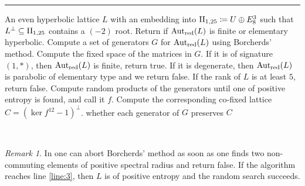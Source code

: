 \documentclass[11pt,letterpaper]{amsart}
\DeclareMathOperator{\Aut}{Aut}
\newcommand{\AutredL}{\Aut_{\rm red}(L)}
\theoremstyle{definition}
\theoremstyle{remark}
\newtheorem{remark}[theorem]{Remark}
\begin{document}
\begingroup
{}\label{alg:Borcherds' test}
\endgroup
\hrule
\begin{algorithmic}[1]
\REQUIRE An even hyperbolic lattice $L$ with an embedding into ${\rm II}_{1,25}\coloneqq U\oplus E_8^3$ such that $L^\perp \subseteq {\rm II}_{1,25}$ contains a $(-2)$ root.
\ENSURE Return if $\AutredL$ is finite or elementary hyperbolic.
\STATE Compute a set of generators $G$ for $\AutredL$ using Borcherds' method. 
\STATE Compute the fixed space of the matrices in $G$. If it is of signature $(1,*)$, then $\AutredL$ is finite, return true. If it is degenerate, then $\AutredL$ is parabolic of elementary type and we return false. 
\STATE If the rank of $L$ is at least $5$, return false.
\STATE Compute random products of the generators until one of positive entropy is found, and call it $f$. Compute the corresponding co-fixed lattice $C=(\ker f^{12} -1)^\perp$. \label{line:3}
\RETURN whether each generator of $G$ preserves $C$  
\end{algorithmic}\hrulefill\\
\begin{remark}
    In  one can abort Borcherds' method as soon as one finds two non-commuting elements of positive spectral radius and return false. 
    If the algorithm reaches line \ref{line:3}, then $L$ is of positive entropy and the random search succeeds.
\end{remark}
\end{document}
